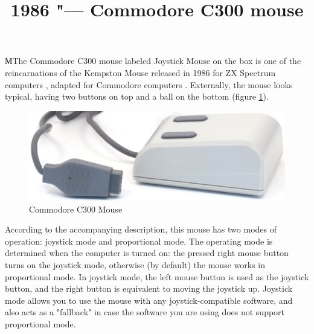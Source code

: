 \documentclass[11pt, a4paper]{article}
\begin{document}
\title{1986 "--- Commodore C300 mouse}
\date{}
\maketitle

МThe Commodore C300 mouse labeled Joystick Mouse on the box is one of the reincarnations of the Kempston Mouse released in 1986 for ZX Spectrum computers \cite{SinclairUser}, adapted for Commodore computers \cite{c64wiki}. Externally, the mouse looks typical, having two buttons on top and a ball on the bottom (figure \ref{fig:C300Pic}).

\begin{figure}[h]
    \centering
    \includegraphics[scale=0.7]{1986_commodore_c300_mouse/cmnirm_30.jpg}
    \caption{Commodore C300 Mouse}
    \label{fig:C300Pic}
\end{figure}

According to the accompanying description, this mouse has two modes of operation: joystick mode and proportional mode. The operating mode is determined when the computer is turned on: the pressed right mouse button turns on the joystick mode, otherwise (by default) the mouse works in proportional mode. In joystick mode, the left mouse button is used as the joystick button, and the right button is equivalent to moving the joystick up. Joystick mode allows you to use the mouse with any joystick-compatible software, and also acts as a "fallback" in case the software you are using does not support proportional mode.
\end{document}
